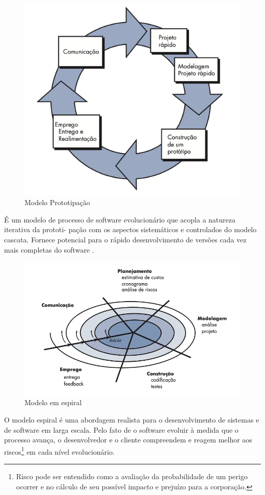 \begin{figure}[H]
	\centering
	\includegraphics[scale=0.4]{imagens/prototipacao.png}
	\caption{Modelo Prototipação \cite{pressman2016engenharia}}
	\label{fig:prototipacao}
\end{figure}



É um modelo de processo de software evolucionário que acopla a natureza iterativa da prototi- pação com os aspectos sistemáticos e controlados do modelo cascata. Fornece potencial para o rápido desenvolvimento de versões cada vez mais completas do software \cite{pressman2016engenharia}.

\begin{figure}[H]
	\centering
	\includegraphics[scale=0.4]{imagens/espiral.png}
	\caption{Modelo em espiral \cite{pressman2016engenharia}}
	\label{fig:espiral}
\end{figure}

O modelo espiral é uma abordagem realista para o desenvolvimento de sistemas e de software em larga escala. Pelo fato de o software evoluir à medida que o processo avança, o desenvolvedor e o cliente compreendem e reagem melhor aos riscos\footnote{Risco pode ser entendido como a avaliação da probabilidade de um perigo ocorrer e no cálculo de seu possível impacto e prejuízo para a corporação.} em cada nível evolucionário.



